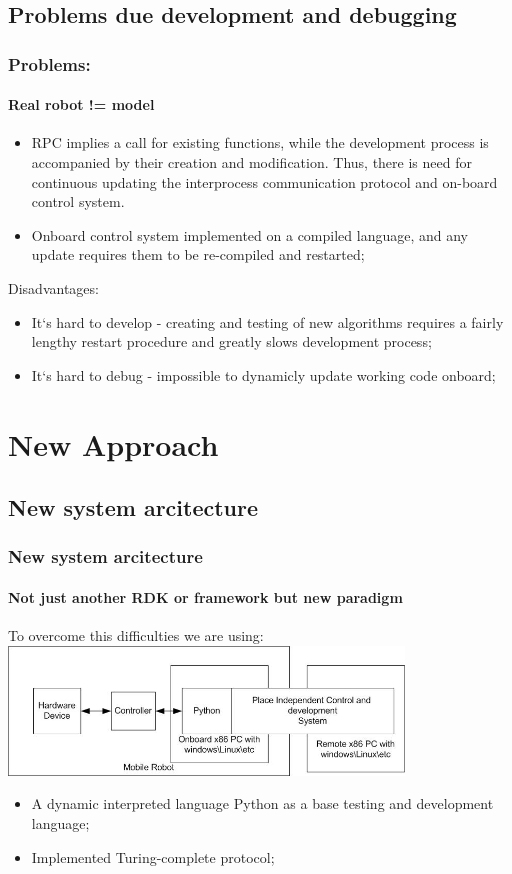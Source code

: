 \documentclass{beamer}
\begin{document}
\subsection{Problems due development and debugging}
\begin{frame}
\frametitle{Problems:}
\framesubtitle{Real robot != model}
\begin{itemize}
\item<1>RPC implies a call for existing functions, while the development process is accompanied by their creation and
modification. Thus, there is need for continuous updating the interprocess communication protocol and on-board control 
system.
\item<1>Onboard control system implemented on a compiled language, and any update requires them to be re-compiled and
restarted;
\end{itemize}
Disadvantages: 
\begin{itemize}
\item<1>It`s hard to develop - creating and testing of new algorithms requires a fairly lengthy restart procedure 
 and greatly slows development process;
\item<1>It`s hard to debug - impossible to dynamicly update working code onboard;
\end{itemize}
\end{frame}

\section{New Approach}
\subsection{New system arcitecture}
\begin{frame}
\frametitle{New system arcitecture}
\framesubtitle{Not just another RDK or framework but new paradigm}

To overcome this difficulties we are using:
\includegraphics[width=10.5cm]{rpc1.jpg}
\begin{itemize}
 \item<1>A dynamic interpreted language Python as a base testing and development language;
 \item<1>Implemented Turing-complete protocol;
\end{itemize}
\end{frame}
\end{document}
